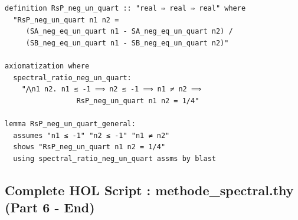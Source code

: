 \documentclass[a4paper,11pt]{article}
\begin{document}
\begin{holcode}[title={\textcolor{white}{File: methode\_spectral.thy -- Part 5/6}}]
\begin{lstlisting}
definition RsP_neg_un_quart :: "real ⇒ real ⇒ real" where
  "RsP_neg_un_quart n1 n2 =
     (SA_neg_eq_un_quart n1 - SA_neg_eq_un_quart n2) /
     (SB_neg_eq_un_quart n1 - SB_neg_eq_un_quart n2)"

axiomatization where
  spectral_ratio_neg_un_quart:
    "⋀n1 n2. n1 ≤ -1 ⟹ n2 ≤ -1 ⟹ n1 ≠ n2 ⟹
                 RsP_neg_un_quart n1 n2 = 1/4"

lemma RsP_neg_un_quart_general:
  assumes "n1 ≤ -1" "n2 ≤ -1" "n1 ≠ n2"
  shows "RsP_neg_un_quart n1 n2 = 1/4"
  using spectral_ratio_neg_un_quart assms by blast
\end{lstlisting}
\end{holcode}

\newpage
\subsection{Complete HOL Script : methode\_spectral.thy (Part 6 - End)}
\end{document}
